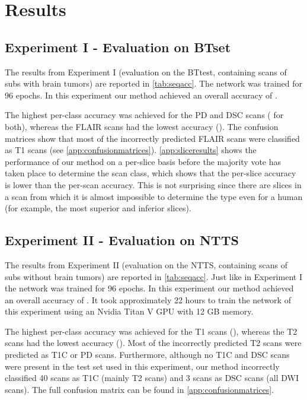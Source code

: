 \section{Results}

\subsection{Experiment I - Evaluation on \gls{BTset}}
The results from Experiment I (evaluation on the \gls{BTtest}, containing \glspl{scan} of \glspl{sub} with brain tumors) are reported in \cref{tab:seqacc}.
The network was trained for 96 epochs.
In this experiment our method achieved an overall accuracy of .

The highest per-class accuracy was achieved for the \gls{PD} and \gls{DSC} \glspl{scan} ( for both), whereas the \gls{FLAIR} \glspl{scan} had the lowest accuracy ().
The confusion matrices show that most of the incorrectly predicted \gls{FLAIR} \glspl{scan} were classified as \gls{T1} \glspl{scan} (see  \cref{app:confusionmatrices}).
\cref{app:sliceresults} shows the performance of our method on a per-\gls{slice} basis before the majority vote has taken place to determine the \gls{scan} \gls{class}, which shows that the per-\gls{slice} accuracy is lower than the per-\gls{scan} accuracy.
This is not surprising since there are \glspl{slice} in a \gls{scan} from which it is almost impossible to determine the \gls{type} even for a human (for example, the most superior and inferior \glspl{slice}).


\subsection{Experiment II - Evaluation on \gls{NTTS}}
The results from Experiment II (evaluation on the \gls{NTTS}, containing \glspl{scan} of \glspl{sub} without brain tumors) are reported in \cref{tab:seqacc}.
Just like in Experiment I the network was trained for 96 epochs.
In this experiment our method achieved an overall accuracy of .
It took approximately 22 hours to train the network of this experiment using an Nvidia Titan V GPU with 12 GB memory.

The highest per-class accuracy was achieved for the \gls{T1} \glspl{scan} (), whereas the \gls{T2} \glspl{scan} had the lowest accuracy ().
Most of the incorrectly predicted \gls{T2} \glspl{scan} were predicted as \gls{T1C} or \gls{PD} \glspl{scan}.
Furthermore, although no \gls{T1C} and \gls{DSC} \glspl{scan} were present in the test set used in this experiment, our method incorrectly classified 40 \glspl{scan} as \gls{T1C} (mainly \gls{T2} \glspl{scan}) and 3 \glspl{scan} as \gls{DSC} \glspl{scan} (all \gls{DWI} \glspl{scan}).
The full confusion matrix can be found in \cref{app:confusionmatrices}.

